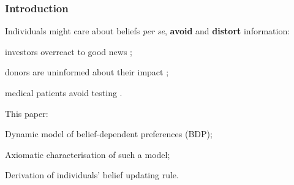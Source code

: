 \documentclass[usenames,dvipsnames,aspectratio=169,11pt]{beamer}
\begin{document}
\begin{frame}
	\maketitle

\end{frame}

\begin{frame}\frametitle{Introduction}

	Individuals might care about beliefs \textit{per se}, \textbf{avoid} and \textbf{distort} information:

	\vfill

	\begin{wideitemize}
		\item investors overreact to good news \citep{danielOverconfidentInvestorsPredictable2015};
		\item donors are uninformed about their impact \citep{niehausTheoryGoodIntentions2014};
		\item medical patients avoid testing \citep{golmanInformationAvoidance2017}.
	\end{wideitemize} \pause

	\vfill

	This paper:

	\vfill

	\begin{wideenumerate}
		\item Dynamic model of belief-dependent preferences (BDP);
		\item Axiomatic characterisation of such a model;
		\item Derivation of individuals' belief updating rule.
	\end{wideenumerate}

\end{frame}
\end{document}
